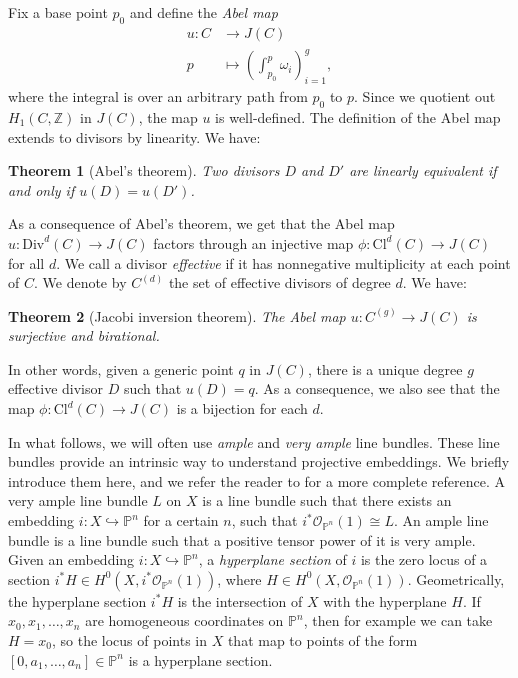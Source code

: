 \documentclass[11pt]{article} %
\newtheorem{theorem}{Theorem}[section]
\theoremstyle{definition}
\newcommand{\Z}{{\mathbb Z}}
\renewcommand{\P}{{\mathbb P}}
\newcommand{\ra}{\rightarrow}
\newcommand{\la}{\label}
\begin{document}
Fix a base point $p_0$ and define the \textit{Abel map}
\begin{align*}
    u:C &\ra J(C)\\
    p &\mapsto \left(\int_{p_0}^p \omega_i \right)_{i=1}^g,
\end{align*}
where the integral is over an arbitrary path from $p_0$ to $p$. Since we quotient out $H_1(C,\Z)$ in $J(C)$, the map $u$ is well-defined. The definition of the Abel map extends to divisors by linearity. We have:
\begin{theorem}[Abel's theorem] \la{thm:abel}
 Two divisors $D$ and $D'$ are linearly equivalent if and only if $u(D)=u(D')$.
\end{theorem}
As a consequence of Abel's theorem, we get that the Abel map $u:\text{Div}^d(C) \ra J(C)$ factors through an injective map $\phi:\text{Cl}^d(C) \ra J(C)$ for all $d$. We call a divisor \textit{effective} if it has nonnegative multiplicity at each point of $C$. We denote by $C^{(d)}$ the set of effective divisors of degree $d$. We have:
\begin{theorem}[Jacobi inversion theorem] \la{thm:jacobi}
 The Abel map $u:C^{(g)} \ra J(C)$ is surjective and birational.
\end{theorem}
In other words, given a generic point $q$ in $J(C)$, there is a unique degree $g$ effective divisor $D$ such that $u(D)=q$. As a consequence, we also see that the map $\phi:\text{Cl}^d(C) \ra J(C)$ is a bijection for each $d$.

In what follows, we will often use \emph{ample} and \emph{very ample} line bundles. These line bundles provide an intrinsic way to understand projective embeddings. We briefly introduce them here, and we refer the reader to \cite{Hart} for a more complete reference. A very ample line bundle $L$ on $X$ is a line bundle such that there exists an embedding $i: X\hookrightarrow \mathbb{P}^n$ for a certain $n$, such that $i^*\mathcal{O}_{\mathbb{P}^n}(1) \cong L$. An ample line bundle is a line bundle such that a positive tensor power of it is very ample. Given an embedding $i: X\hookrightarrow \mathbb{P}^n$, a \emph{hyperplane section} of $i$ is the zero locus of a section $i^*H\in H^0(X,i^*\mathcal{O}_{\mathbb{P}^n}(1))$, where $H\in H^0(X,\mathcal{O}_{\mathbb{P}^n}(1))$. Geometrically, the hyperplane section $i^*H$ is the intersection of $X$ with the hyperplane $H$. If $x_0,x_1,\dots,x_n$ are homogeneous coordinates on $\P^n$, then for example we can take $H=x_0$, so the locus of points in $X$ that map to points of the form $[0,a_1,\dots,a_n]  \in \P^n$ is a hyperplane section.
\end{document}
